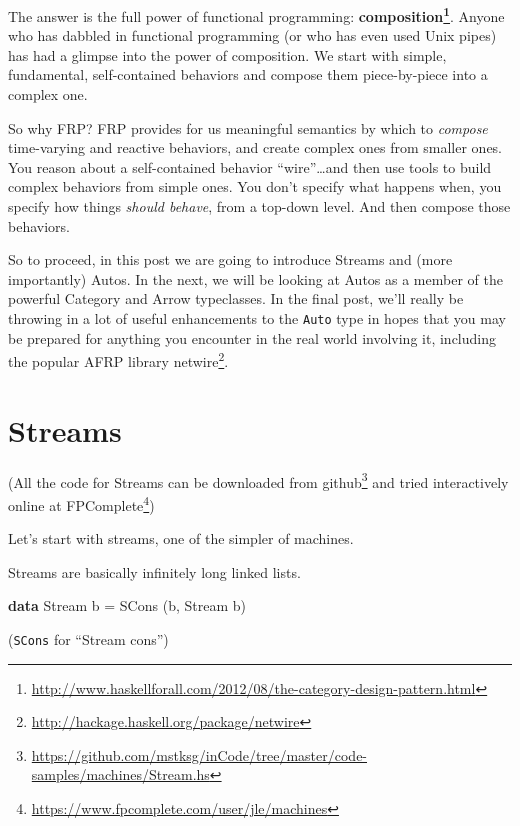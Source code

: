 \documentclass[]{article}
\newenvironment{Shaded}{}{}
\newcommand{\DataTypeTok}[1]{\textcolor[rgb]{0.56,0.13,0.00}{#1}}
\newcommand{\FunctionTok}[1]{\textcolor[rgb]{0.02,0.16,0.49}{#1}}
\newcommand{\KeywordTok}[1]{\textcolor[rgb]{0.00,0.44,0.13}{\textbf{#1}}}
\newcommand{\NormalTok}[1]{#1}
\renewcommand{\href}[2]{#2\footnote{\url{#1}}}
\begin{document}
The answer is the full power of functional programming:
\textbf{\href{http://www.haskellforall.com/2012/08/the-category-design-pattern.html}{composition}}.
Anyone who has dabbled in functional programming (or who has even used Unix
pipes) has had a glimpse into the power of composition. We start with simple,
fundamental, self-contained behaviors and compose them piece-by-piece into a
complex one.

So why FRP? FRP provides for us meaningful semantics by which to \emph{compose}
time-varying and reactive behaviors, and create complex ones from smaller ones.
You reason about a self-contained behavior ``wire''\ldots{}and then use tools to
build complex behaviors from simple ones. You don't specify what happens when,
you specify how things \emph{should behave}, from a top-down level. And then
compose those behaviors.

So to proceed, in this post we are going to introduce Streams and (more
importantly) Autos. In the next, we will be looking at Autos as a member of the
powerful Category and Arrow typeclasses. In the final post, we'll really be
throwing in a lot of useful enhancements to the \texttt{Auto} type in hopes that
you may be prepared for anything you encounter in the real world involving it,
including the popular AFRP library
\href{http://hackage.haskell.org/package/netwire}{netwire}.

\hypertarget{streams}{%
\section{Streams}\label{streams}}

(All the code for Streams can be downloaded
\href{https://github.com/mstksg/inCode/tree/master/code-samples/machines/Stream.hs}{from
github} and tried interactively online
\href{https://www.fpcomplete.com/user/jle/machines}{at FPComplete})

Let's start with streams, one of the simpler of machines.

Streams are basically infinitely long linked lists.

\begin{Shaded}
\begin{Highlighting}[]
\KeywordTok{data} \DataTypeTok{Stream}\NormalTok{ b }\FunctionTok{=} \DataTypeTok{SCons}\NormalTok{ (b, }\DataTypeTok{Stream}\NormalTok{ b)}
\end{Highlighting}
\end{Shaded}

(\texttt{SCons} for ``Stream cons'')
\end{document}
